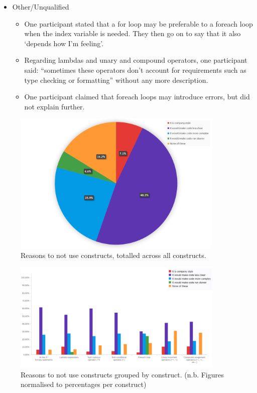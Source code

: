 \documentclass{article}
\begin{document}
\begin{itemize}
\begin{itemize}
                \end{itemize}
                \item Other/Unqualified
                \begin{itemize}
                    \item One participant stated that a for loop may be preferable to a foreach loop when the index variable is needed. They then go on to say that it also `depends how I'm feeling'.
                    \item Regarding lambdas and unary and compound operators, one participant said: ``sometimes these operators don't account for requirements such as type checking or formatting'' without any more description.
                    \item One participant claimed that foreach loops may introduce errors, but did not explain further.
                \end{itemize}
            \end{itemize}

            \begin{figure}[htbp]
                \centering
                \includegraphics[width=0.9\textwidth]{toNotUsePie}
                \caption{Reasons to not use constructs, totalled across all constructs.}
                \label{fig:toNotUsePie}
            \end{figure}
            \begin{figure}[htbp]
                \centering
                \includegraphics[width=0.9\textwidth]{toNotUse}
                \caption{Reasons to not use constructs grouped by construct. (n.b. Figures normalised to percentages per construct)}
                \label{fig:toNotUse}
            \end{figure}
\end{document}
